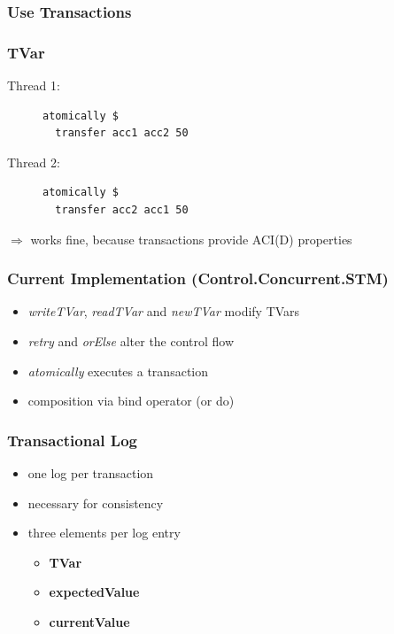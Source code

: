 \documentclass{beamer}
\newcommand{\code}[1]{\textbf{#1}}
\begin{document}
  \begin{frame}
    \frametitle{Use Transactions}
       
  \end{frame}
  
  \begin{frame}[fragile]
    \frametitle{TVar}
    \fboxsep=0pt
    \noindent
    \begin{minipage}[t]{0.48\linewidth}
      Thread 1:
      \begin{figure}
       \begin{lstlisting}[frame=single]
atomically $ 
  transfer acc1 acc2 50
       \end{lstlisting}
      \end{figure}
    \end{minipage}%
    \hfill%
    \begin{minipage}[t]{0.48\linewidth}
      Thread 2:
      \begin{figure}
       \begin{lstlisting}[frame=single]
atomically $ 
  transfer acc2 acc1 50
       \end{lstlisting}
      \end{figure}
    \end{minipage}
    \vfill
    \pause
    $\Rightarrow$ works fine, because transactions provide ACI(D) properties
\end{frame}
  \begin{frame}
    \frametitle{Current Implementation (Control.Concurrent.STM)}
    \begin{itemize}\setlength\itemsep{1em}
      \item \textit{writeTVar}, \textit{readTVar} and \textit{newTVar} modify TVars
      \item \textit{retry} and \textit{orElse} alter the control flow
      \item \textit{atomically} executes a transaction 
      \item composition via bind operator (or do)
    \end{itemize}
  \end{frame}
  
  \begin{frame}
   \frametitle{Transactional Log}
   \begin{itemize}\setlength\itemsep{1em}
    \item one log per transaction
    \item necessary for consistency
    \item three elements per log entry
          \begin{itemize}
           \item \code{TVar}
           \item \code{expectedValue}
           \item \code{currentValue}
          \end{itemize}
   \end{itemize}
  \end{frame}
  
\end{document}
